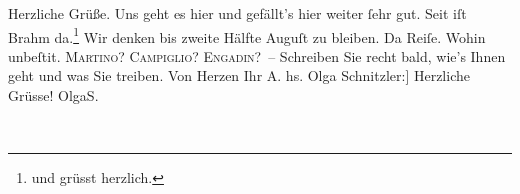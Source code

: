 \begin{ledgroupsized}[t]{13cm}
           \pstart
           {\pb}Herzliche Grüße. Uns geht es hier und gefällt’s hier
               weiter ſehr gut. Seit \label{K_L01784_1v}\label{K_L01784_1h} iſt Brahm da.\footnote{\noindent{}und grüsst herzlich.} Wir denken bis zweite Hälfte Auguſt zu bleiben. Da{\geminationn} Reiſe. Wohin unbeſti{\geminationm}t.
                  \textsc{Martino}? \textsc{Campiglio}? \textsc{Engadin}? – Schreiben Sie recht bald, wie’s Ihnen geht und was Sie {\pb}treiben. \pend
           \pstart Von Herzen Ihr \spacefill\mbox{A.}\pend{}\pstart
           \noindent{}{[}hs. Olga Schnitzler:{]} Herzliche Grüsse!\pend
           \pstart \spacefill\mbox{OlgaS.}\pend{}
         
         \endnumbering{}\end{ledgroupsized}  \newcommand{\dateiname}{L01784}\newcommand{\titel}{Arthur und Olga Schnitzler an Richard Beer-Hofmann, 20. 7. 1908}\newcommand{\editorInnen}{Martin Anton Müller und Gerd-Hermann Susen}
      